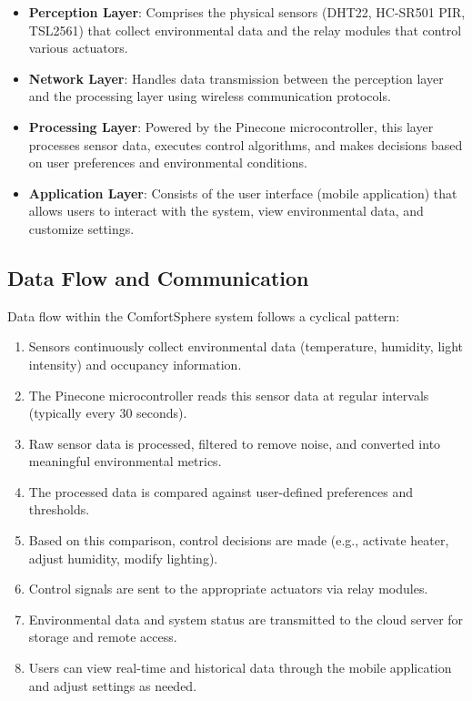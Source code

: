 \documentclass[a4paper]{scrartcl}
\begin{document}
	\begin{itemize}
		\item \textbf{Perception Layer}: Comprises the physical sensors (DHT22, HC-SR501 PIR, TSL2561) that collect environmental data and the relay modules that control various actuators.
		\item \textbf{Network Layer}: Handles data transmission between the perception layer and the processing layer using wireless communication protocols.
		\item \textbf{Processing Layer}: Powered by the Pinecone microcontroller, this layer processes sensor data, executes control algorithms, and makes decisions based on user preferences and environmental conditions.
		\item \textbf{Application Layer}: Consists of the user interface (mobile application) that allows users to interact with the system, view environmental data, and customize settings.
	\end{itemize}
	
	\subsection{Data Flow and Communication}
	Data flow within the ComfortSphere system follows a cyclical pattern:
	
	\begin{enumerate}
		\item Sensors continuously collect environmental data (temperature, humidity, light intensity) and occupancy information.
		\item The Pinecone microcontroller reads this sensor data at regular intervals (typically every 30 seconds).
		\item Raw sensor data is processed, filtered to remove noise, and converted into meaningful environmental metrics.
		\item The processed data is compared against user-defined preferences and thresholds.
		\item Based on this comparison, control decisions are made (e.g., activate heater, adjust humidity, modify lighting).
		\item Control signals are sent to the appropriate actuators via relay modules.
		\item Environmental data and system status are transmitted to the cloud server for storage and remote access.
		\item Users can view real-time and historical data through the mobile application and adjust settings as needed.
	\end{enumerate}
	
\end{document}
